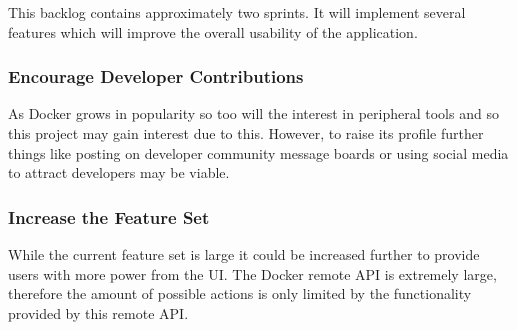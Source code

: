 This backlog contains approximately two sprints. It will implement several features which will improve the overall usability of the application.

\subsubsection{Encourage Developer Contributions}
As Docker grows in popularity so too will the interest in peripheral tools and so this project may gain interest due to this. However, to raise its profile further things like posting on developer community message boards or using social media to attract developers may be viable.

\subsubsection{Increase the Feature Set}
While the current feature set is large it could be increased further to provide users with more power from the UI. The Docker remote API is extremely large, therefore the amount of possible actions is only limited by the functionality provided by this remote API.
